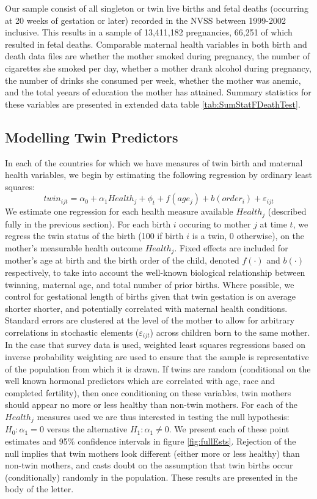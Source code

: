 \documentclass{nature}
\begin{document}
\begin{linenumbers}
Our sample consist of all singleton or twin live births and fetal deaths (occurring at 20 weeks of gestation or later) recorded in the NVSS between 1999-2002 inclusive.  This results in a sample of 13,411,182 pregnancies, 66,251 of which resulted in fetal deaths.  Comparable maternal health variables in both birth and death data files are whether the mother smoked during pregnancy, the number of cigarettes she smoked per day, whether a mother drank alcohol during pregnancy, the number of drinks she consumed per week, whether the mother was anemic, and the total yeears of education the mother has attained.  Summary statistics for these variables are presented in extended data table \ref{tab:SumStatFDeathTest}.

\subsection{Modelling Twin Predictors}
In each of the countries for which we have measures of twin birth and maternal health variables, we begin by estimating the following regression by ordinary least squares:
\begin{equation}
  twin_{ijt}=\alpha_0 + \alpha_1 Health_j + \phi_t + f(age_j) + b(order_i) + \varepsilon_{ijt}
\end{equation}
We estimate one regression for each health measure available $Health_j$ (described fully in the previous section).  For each birth $i$ occuring to mother $j$ at time $t$, we regress the twin status of the birth (100 if birth $i$ is a twin, 0 otherwise), on the mother's measurable health outcome $Health_j$. Fixed effects are included for mother's age at birth and the birth order of the child, denoted $f(\cdot)$ and $b(\cdot)$ respectively, to take into account the well-known biological relationship between twinning, maternal age, and total number of prior births.  Where possible, we control for gestational length of births given that twin gestation is on average shorter shorter, and potentially correlated with maternal health conditions\cite{Morrison2005}.  Standard errors are clustered at the level of the mother to allow for arbitrary correlations in stochastic elements ($\varepsilon_{ijt}$) across children born to the same mother. In the case that survey data is used, weighted least squares regressions based on inverse probability weighting are used to ensure that the sample is representative of the population from which it is drawn. If twins are random (conditional on the well known  hormonal predictors which are correlated with age, race and completed fertility\cite{Hall2003,Hoekstraetal2008}), then once conditioning on these variables, twin mothers should appear no more or less healthy than non-twin mothers.  For each of the $Health_j$ measures used we are thus interested in testing the null hypothesis: $H_0: \alpha_1=0$ versus the alternative $H_1: \alpha_1\neq0$.  We present each of these point estimates and 95\% confidence intervals in figure \ref{fig:fullEsts}. Rejection of the null implies that twin mothers look different (either more or less healthy) than non-twin mothers, and casts doubt on the assumption that twin births occur (conditionally) randomly in the population.  These results are presented in the body of the letter.

\end{linenumbers}
\end{document}
